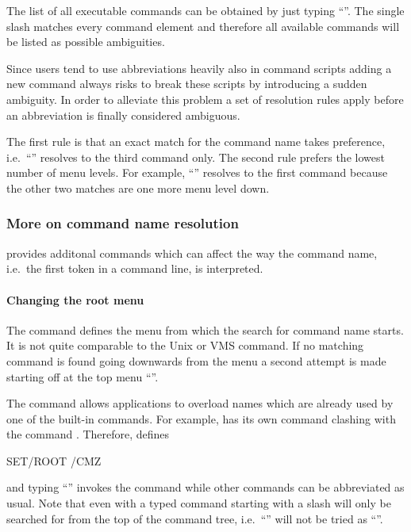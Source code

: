 The list of all executable commands can be obtained by just typing
``\Lit{/}''. 
The single slash matches every command element and therefore all
available commands will be listed as possible ambiguities.

Since users tend to use abbreviations heavily also in command scripts
adding a new command always risks to break these scripts by introducing a
sudden ambiguity.
In order to alleviate this problem a set of resolution rules apply
before an abbreviation is finally considered ambiguous.

The first rule is that an exact match for the command name takes
preference, i.e.\ ``'' resolves to the third command only.
The second rule prefers the lowest number of menu levels.
For example, ``'' resolves to the first command because the
other two matches are one more menu level down.

%
%
\subsubsection{More on command name resolution}

\KUIP{} provides additonal commands which can affect the way the
command name, i.e.\ the first token in a command line, is interpreted.


\paragraph{Changing the root menu}

The command  defines the menu from which the search for
command name starts. 
It is not quite comparable to the Unix  or VMS 
 command.
If no matching command is found going downwards from the
 menu a second attempt is made starting off at the top
menu ``\Lit{/}''.

\ifKUIPman
The  command allows applications to overload names which
are already used by one of the \KUIP{} built-in commands. 
For example, \CMZ{} has its own command 
clashing with the command .
Therefore, \CMZ{} defines
\begin{XMP}
SET/ROOT /CMZ
\end{XMP}
and typing ``'' invokes the \CMZ{} command while other
\KUIP{} commands can be abbreviated as usual.
Note that even with  a typed command starting with a
slash will only be searched for from the top of the command tree, i.e.\
``'' will not be tried as ``''.
\fi%


